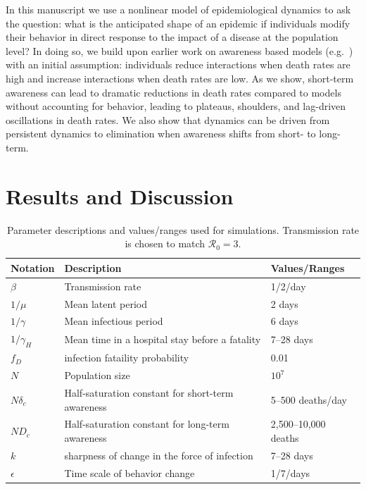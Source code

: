 In this manuscript we use a nonlinear model of epidemiological dynamics to
ask the question: what is the anticipated
shape of an epidemic if individuals modify their behavior in direct
response to the impact of a disease at the population level? In doing so,
we build upon earlier work on awareness based models (e.g.~\citep{funk2009spread,funk2010modelling,eksin2017disease, eksin2019systematic}) with an
initial assumption: individuals reduce interactions when 
death rates are high and increase interactions when death rates are low.  
As we show, short-term awareness can lead to dramatic reductions
in death rates compared to models without accounting for behavior,
leading to plateaus, shoulders,
and lag-driven oscillations in death rates. We also show that dynamics
can be driven from persistent dynamics to elimination when
awareness shifts from short- to long-term.


\section{Results and Discussion}

\begin{table}[!h]
\begin{tabular}{l|p{3cm}|l}
\hline
Notation & Description & Values/Ranges\\
\hline
$\beta$ & Transmission rate & 1/2/day \\
$1/\mu$ & Mean latent period & 2 days \\
$1/\gamma$ & Mean infectious period & 6 days \\
$1/\gamma_H$ & Mean time in a hospital stay before a fatality & 7--28 days\\
$f_D$ & infection fataility probability & 0.01 \\
$N$ & Population size & $10^7$ \\
$N\delta_c$ & Half-saturation constant for short-term awareness & 5--500 deaths/day \\
$ND_c$ & Half-saturation constant for long-term awareness & 2,500--10,000 deaths \\
$k$ & sharpness of change in the force of infection & 7--28 days \\
$\epsilon$ & Time scale of behavior change & 1/7/days \\
\hline
\end{tabular}
\caption{
Parameter descriptions and values/ranges used for simulations. Transmission rate is chosen to match $\mathcal{R}_0 = 3$.
}
\end{table}

